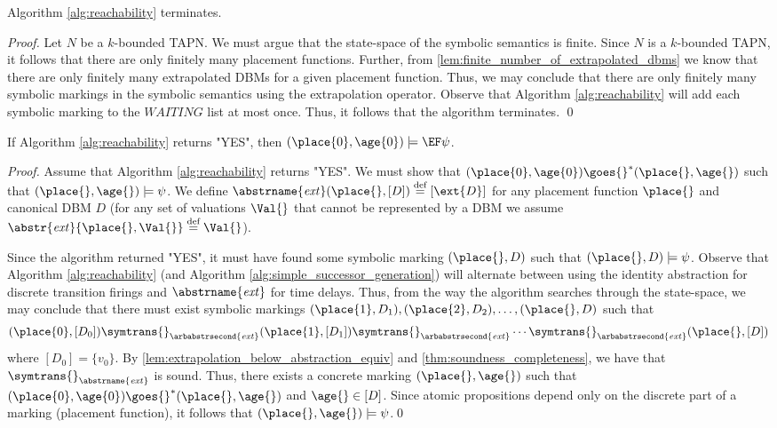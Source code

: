 \begin{lemma}\label{lem:algorithm_termination}
Algorithm \ref{alg:reachability} terminates.
\end{lemma}
\begin{proof}
Let $N$ be a $k$-bounded TAPN. We must argue that the state-space of the symbolic semantics is finite. Since $N$ is a $k$-bounded TAPN, it follows that there are only finitely many placement functions. Further, from \cref{lem:finite_number_of_extrapolated_dbms} we know that there are only finitely many extrapolated DBMs for a given placement function. Thus, we may conclude that there are only finitely many symbolic markings in the symbolic semantics using the extrapolation operator. Observe that Algorithm \ref{alg:reachability} will add each symbolic marking to the $\mathit{WAITING}$ list at most once. Thus, it follows that the algorithm terminates.
\qed
\end{proof}

\begin{lemma}\label{lem:algorithm_yes_implies_initial_marking_satisfies_property}
If Algorithm \ref{alg:reachability} returns "YES", then $(\place{0},\age{0}) \models \EF \psi$.
\end{lemma}
\begin{proof}
Assume that Algorithm \ref{alg:reachability} returns "YES". We must show that $(\place{0},\age{0}) \goes{}^* (\place{},\age{})$ such that $(\place{}, \age{}) \models \psi$. We define $\abstrname{\mathit{ext}}(\place{}, [D]) \stackrel{\text{def}}{=} [\ext{D}]$ for any placement function $\place{}$ and canonical DBM $D$ (for any set of valuations $\Val{}$ that cannot be represented by a DBM we assume $\abstr{\mathit{ext}}{\place{},\Val{}} \stackrel{\text{def}}{=} \Val{}$).

Since the algorithm returned "YES", it must have found some symbolic marking $(\place{}, D)$ such that $(\place{},D) \models \psi$. Observe that Algorithm \ref{alg:reachability} (and Algorithm \ref{alg:simple_successor_generation}) will alternate between using the identity abstraction for discrete transition firings and $\abstrname{\mathit{ext}}$ for time delays. Thus, from the way the algorithm searches through the state-space, we may conclude that there must exist symbolic markings $(\place{1}, D_1), (\place{2},D_2), \ldots, (\place{},D)$ such that
\begin{align*}
(\place{0}, [D_0]) \symtrans{}_{\arbabstrsecond{\mathit{ext}}} (\place{1},[D_1]) \symtrans{}_{\arbabstrsecond{\mathit{ext}}} \cdots \symtrans{}_{\arbabstrsecond{\mathit{ext}}} (\place{}, [D])
\end{align*}
where $[D_0] = \{ v_0 \}$. By \cref{lem:extrapolation_below_abstraction_equiv} and \cref{thm:soundness_completeness}, we have that $\symtrans{}_{\abstrname{\mathit{ext}}}$ is sound. Thus, there exists a concrete marking $(\place{}, \age{})$ such that $(\place{0}, \age{0}) \goes{}^* (\place{},\age{})$ and $\age{} \in [D]$. Since atomic propositions depend only on the discrete part of a marking (placement function), it follows that $(\place{},\age{}) \models \psi$.\qed
\end{proof}

